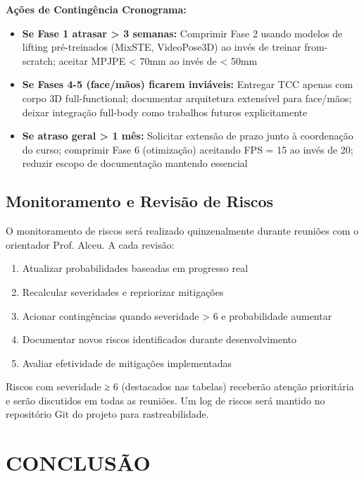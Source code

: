 \documentclass[12pt, a4paper]{article}
\begin{document}
\textbf{Ações de Contingência Cronograma:}
\begin{itemize}
    \item \textbf{Se Fase 1 atrasar > 3 semanas:} Comprimir Fase 2 usando modelos de lifting pré-treinados (MixSTE, VideoPose3D) ao invés de treinar from-scratch; aceitar MPJPE < 70mm ao invés de < 50mm
    
    \item \textbf{Se Fases 4-5 (face/mãos) ficarem inviáveis:} Entregar TCC apenas com corpo 3D full-functional; documentar arquitetura extensível para face/mãos; deixar integração full-body como trabalhos futuros explicitamente
    
    \item \textbf{Se atraso geral > 1 mês:} Solicitar extensão de prazo junto à coordenação do curso; comprimir Fase 6 (otimização) aceitando FPS = 15 ao invés de 20; reduzir escopo de documentação mantendo essencial
\end{itemize}

\subsection{Monitoramento e Revisão de Riscos}

O monitoramento de riscos será realizado quinzenalmente durante reuniões com o orientador Prof. Alceu. A cada revisão:

\begin{enumerate}
    \item Atualizar probabilidades baseadas em progresso real
    \item Recalcular severidades e repriorizar mitigações
    \item Acionar contingências quando severidade > 6 e probabilidade aumentar
    \item Documentar novos riscos identificados durante desenvolvimento
    \item Avaliar efetividade de mitigações implementadas
\end{enumerate}

Riscos com severidade ≥ 6 (destacados nas tabelas) receberão atenção prioritária e serão discutidos em todas as reuniões. Um log de riscos será mantido no repositório Git do projeto para rastreabilidade.

\section{CONCLUSÃO}
\end{document}
